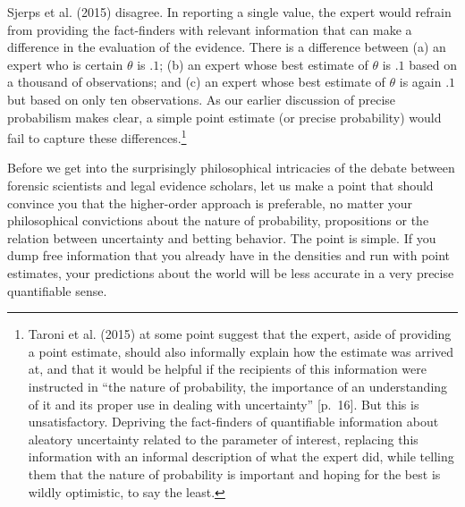 \documentclass[
  10pt,
  dvipsnames,enabledeprecatedfontcommands]{scrartcl}
\begin{document}
Sjerps et al. (2015) disagree. In reporting a single value, the expert
would refrain from providing the fact-finders with relevant information
that can make a difference in the evaluation of the evidence. There is a
difference between (a) an expert who is certain \(\theta\) is \(.1\);
(b) an expert whose best estimate of \(\theta\) is \(.1\) based on a
thousand of observations; and (c) an expert whose best estimate of
\(\theta\) is again \(.1\) but based on only ten observations. As our
earlier discussion of precise probabilism makes clear, a simple point
estimate (or precise probability) would fail to capture these
differences.\footnote{ Taroni et al. (2015) at some point suggest that
  the expert, aside of providing a point estimate, should also
  informally explain how the estimate was arrived at, and that it would
  be helpful if the recipients of this information were instructed in
  ``the nature of probability, the importance of an understanding of it
  and its proper use in dealing with uncertainty'' {[}p.~16{]}. But this
  is unsatisfactory. Depriving the fact-finders of quantifiable
  information about aleatory uncertainty related to the parameter of
  interest, replacing this information with an informal description of
  what the expert did, while telling them that the nature of probability
  is important and hoping for the best is wildly optimistic, to say the
  least.}

Before we get into the surprisingly philosophical intricacies of the
debate between forensic scientists and legal evidence scholars, let us
make a point that should convince you that the higher-order approach is
preferable, no matter your philosophical convictions about the nature of
probability, propositions or the relation between uncertainty and
betting behavior. The point is simple. If you dump free information that
you already have in the densities and run with point estimates, your
predictions about the world will be less accurate in a very precise
quantifiable sense.
\end{document}
